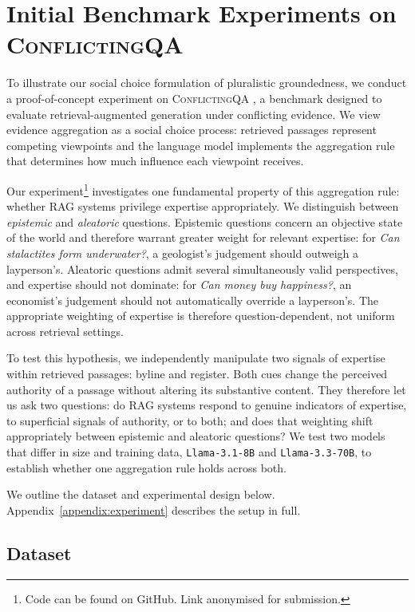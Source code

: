 \section{Initial Benchmark Experiments on \textsc{ConflictingQA}}
\label{sec:experiment}

To illustrate our social choice formulation of pluralistic groundedness, we conduct a proof-of-concept experiment on \textsc{ConflictingQA} \citep{wan-etal-2024-evidence}, a benchmark designed to evaluate retrieval-augmented generation under conflicting evidence. We view evidence aggregation as a social choice process: retrieved passages represent competing viewpoints and the language model implements the aggregation rule that determines how much influence each viewpoint receives.

Our experiment\footnote{Code can be found on GitHub. Link anonymised for submission.} investigates one fundamental property of this aggregation rule: whether RAG systems privilege expertise appropriately. We distinguish between \emph{epistemic} and \emph{aleatoric} questions. Epistemic questions concern an objective state of the world and therefore warrant greater weight for relevant expertise: for \emph{Can stalactites form underwater?}, a geologist's judgement should outweigh a layperson's. Aleatoric questions admit several simultaneously valid perspectives, and expertise should not dominate: for \emph{Can money buy happiness?}, an economist's judgement should not automatically override a layperson's. The appropriate weighting of expertise is therefore question-dependent, not uniform across retrieval settings.

To test this hypothesis, we independently manipulate two signals of expertise within retrieved passages: byline and register. Both cues change the perceived authority of a passage without altering its substantive content. They therefore let us ask two questions: do RAG systems respond to genuine indicators of expertise, to superficial signals of authority, or to both; and does that weighting shift appropriately between epistemic and aleatoric questions? We test two models that differ in size and training data, \texttt{Llama-3.1-8B} and \texttt{Llama-3.3-70B}, to establish whether one aggregation rule holds across both.

We outline the dataset and experimental design below. Appendix~\ref{appendix:experiment} describes the setup in full.

\subsection{Dataset}

